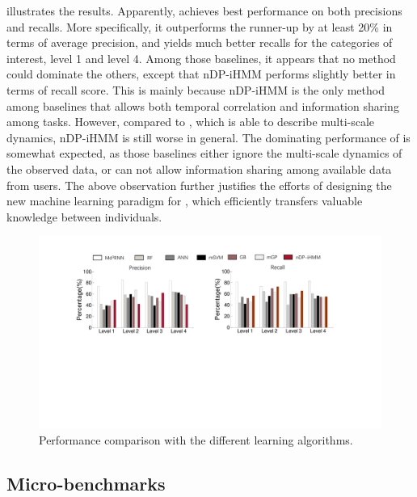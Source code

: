  illustrates the results. Apparently, \modelname achieves best performance on both precisions and recalls.
More specifically, it outperforms the runner-up by at least 20\% in terms of average precision, and yields much better recalls for the categories of interest, \ie level 1 and level 4.
Among those baselines, it appears that no method could dominate the others, except that nDP-iHMM performs slightly better in terms of recall score.
This is mainly because nDP-iHMM is the only method among baselines that allows both temporal correlation and information sharing among tasks.
However, compared to \modelname, which is able to describe multi-scale dynamics, nDP-iHMM is still worse in general.
The dominating performance of \modelname is somewhat expected, as those baselines either ignore the multi-scale dynamics of the observed data, or can not allow information sharing among available data from users.
The above observation further justifies the efforts of designing the new machine learning paradigm for \sysname, which efficiently transfers valuable knowledge between individuals.
\begin{figure}[h]
  \centering
  \includegraphics[width=0.9\columnwidth]{./img/Model_CMP1.pdf}
  \caption{Performance comparison with the different learning algorithms.}
  \label{fig:cmp_models}
\end{figure}





\subsection{Micro-benchmarks}
